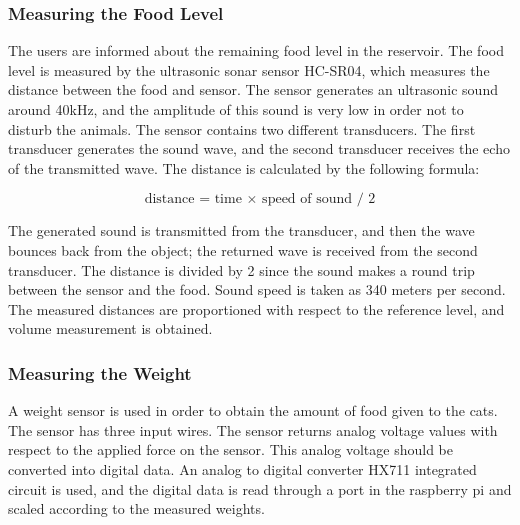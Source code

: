 \subsubsection{Measuring the Food Level}

The users are informed about the remaining food level in the reservoir. The food level is measured by the ultrasonic sonar sensor HC-SR04, which measures the distance between the food and sensor. The sensor generates an ultrasonic sound around 40kHz, and the amplitude of this sound is very low in order not to disturb the animals. The sensor contains two different transducers. The first transducer generates the sound wave, and the second transducer receives the echo of the transmitted wave. The distance is calculated by the following formula:

\begin{equation}
\text{distance = time $\times$ speed of sound  /  2}
\end{equation} %

The generated sound is transmitted from the transducer, and then the wave bounces back from the object; the returned wave is received from the second transducer. The distance is divided by 2 since the sound makes a round trip between the sensor and the food. Sound speed is taken as 340 meters per second. The measured distances are proportioned with respect to the reference level, and volume measurement is obtained.


\subsubsection{Measuring the Weight}
  
A weight sensor is used in order to obtain the amount of food given to the cats.  The sensor has three input wires. The sensor returns analog voltage values with respect to the applied force on the sensor. This analog voltage should be converted into digital data. An analog to digital converter HX711 integrated circuit is used, and the digital data is read through a port in the raspberry pi and scaled according to the measured weights.




